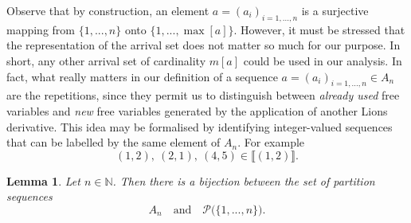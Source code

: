 \documentclass[a4paper,11pt,twoside]{article}
\numberwithin{equation}{section}
\theoremstyle{plain}
\newtheorem{lemma}[theorem]{Lemma}
\newcommand{\bN}{\mathbb{N}}
\newcommand{\scP}{\mathscr{P}}
\newcommand{\1}{\mathbbm{1}}
\begin{document}
	Observe that by construction, an element $a=(a_{i})_{i=1,...,n}$ is a surjective mapping from $\{1,...,n\}$ onto $\big\{ 1, ..., \max[a] \big\}$. However, it must be stressed that the representation of the arrival set does not matter so much for our purpose. In short, any other arrival set of cardinality $m[a]$ could be used in our analysis. In fact, what really matters in our definition of a sequence $a=(a_{i})_{i=1,...,n} \in A_{n}$ are the repetitions, since they permit us to distinguish between \textit{already used} free variables and \textit{new} free variables generated by the application of another Lions derivative. This idea may be formalised by identifying integer-valued sequences that can be labelled by the same element of $A_{n}$. 
	For example
	$$
	(1, 2), \  (2, 1), \  (4, 5) \in \bigl\llbracket (1,2)\bigr\rrbracket.  
	$$
	
	\begin{lemma}
		\label{Lemma:Bijection-Partition-simple}
		Let $n\in \bN$. Then there is a bijection between the set of partition sequences 
		$$
		A_n \quad\mbox{and}\quad \scP\big( \{1, ..., n\}\big).
		$$
	\end{lemma}
	
\end{document}
